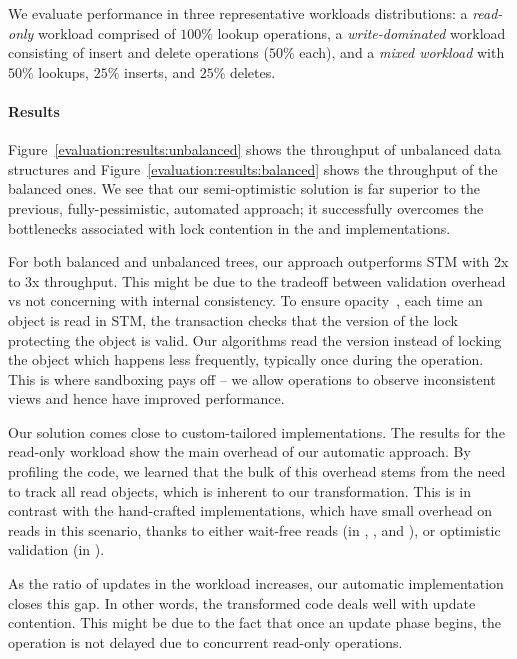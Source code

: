 We evaluate performance in three representative workloads distributions: a
\emph{read-only} workload comprised of $100\%$ lookup operations, a \emph{write-dominated}
workload consisting of insert and delete operations ($50\%$ each), and a
\emph{mixed workload} with $50\%$ lookups, $25\%$ inserts, and $25\%$
deletes.

\paragraph{Results}
Figure~\ref{evaluation:results:unbalanced}
shows the throughput of unbalanced data structures and Figure~\ref{evaluation:results:balanced} shows
the throughput of the balanced ones. We see that our semi-optimistic
solution is far superior to the previous, fully-pessimistic,
automated approach; it successfully overcomes the bottlenecks associated with lock contention
in the \domTree and \domTreap implementations. 

For both balanced and unbalanced trees, our approach outperforms STM with 2x to 3x throughput.
This might be due to the tradeoff between validation overhead vs not concerning with internal consistency.
To ensure opacity~\cite{GuerraouiK2008}, each time an object is read in STM, the transaction checks that the version of the lock protecting the object is valid. 
Our algorithms read the version instead of locking the object which happens less frequently, typically once during the operation.
This is where sandboxing pays off -- we allow operations to observe inconsistent views and hence have improved performance.


Our solution comes close to custom-tailored implementations.
The results for the read-only workload show the main overhead
of our automatic approach. By profiling the code, we learned
that the bulk of this overhead stems from the need to track all read objects,
which is inherent to our transformation.
This is in contrast with the hand-crafted implementations,
which have small overhead on reads in this scenario, thanks to either
wait-free reads (in \danaAVL, \danaTree, \friendly and \lockfreeTree ), or optimistic validation (in \bronson).

As the ratio of updates in the workload increases, our automatic implementation
closes this gap.
In other words, the transformed code deals well with update contention.
This might be due to the fact that once
an update phase begins, the operation is not delayed due to concurrent
read-only operations.

